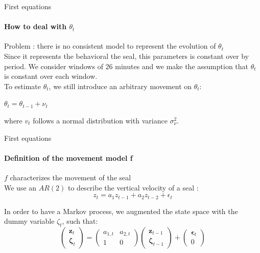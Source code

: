 \documentclass[dvipsnames, handout]{beamer}
\begin{document}
\begin{frame}{First equations}
\framesubtitle{How to deal with $\theta_{t}$}

Problem : there is no consistent model to represent the evolution of $\theta_{t}$
\newline
\\
Since it represents the behavioral the seal, this parameters is constant over by period.
We consider windows of 26 minutes and we make the assumption that $\theta_{t}$ is constant over each window.
\newline
\\
To estimate $\theta_{t}$, we still introduce an arbitrary movement on $\theta_{t}$:
\begin{center}

$\theta_t = \theta_{t-1} + \nu_t$

\end{center}
where $v_t$ follows a normal distribution with variance $\sigma_\nu^2$.\\

\end{frame}

\begin{frame}{First equations}
\framesubtitle{Definition of the movement model f}

$f$ characterizes the movement of the seal
\newline
\\
We use an $AR(2)$ to describe the vertical velocity of a seal :
\begin{equation}
z_t = a_1z_{t-1} + a_2z_{t-2} + \epsilon_t
\end{equation}

In order to have a Markov process, we augmented the state space with the dummy variable $\zeta_t$, such that:
\begin{equation}
\begin{pmatrix}
\mathbf{z}_t\\\mathbf{\zeta}_t
\end{pmatrix}
=
\begin{pmatrix}
a_{1,t}& a_{2,t} \\
1 & 0
\end{pmatrix}
\begin{pmatrix}
\mathbf{z}_{t-1}\\\mathbf{\zeta}_{t-1}
\end{pmatrix}
+
\begin{pmatrix}
\mathbf{\epsilon}_t \\ 0
\end{pmatrix}
\end{equation}
\end{frame}
\end{document}
